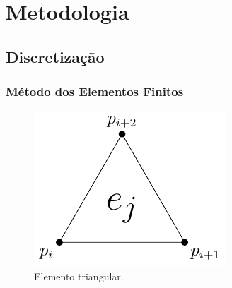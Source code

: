 \documentclass{beamer}
\begin{document}
\section{Metodologia}

\subsection{Discretização}
\begin{frame}
  \frametitle{Método dos Elementos Finitos}
  \begin{figure}
    \includegraphics[width=0.5\linewidth]{figure/element.pdf}
    \caption{Elemento triangular.}
  \end{figure}
\end{frame}
\end{document}
